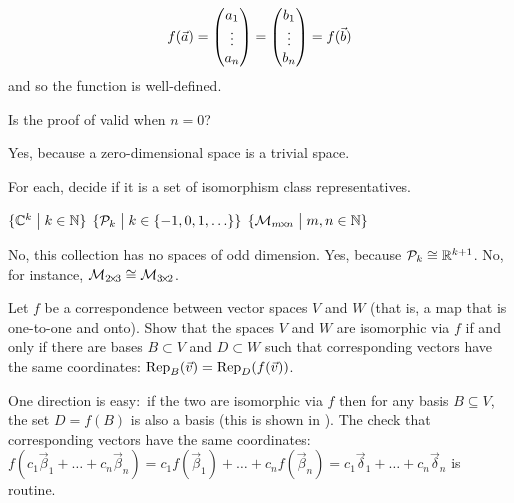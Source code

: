 \begin{exercises}
\begin{answer}
\begin{equation*}
          f(\vec{a})
          =\colvec{a_1 \\ \vdots \\ a_n}=\colvec{b_1 \\ \vdots \\ b_n}
          =f(\vec{b})          
        \end{equation*}
        and so the function is well-defined.
     \end{answer}
  \item 
     Is the proof of  valid when \( n=0 \)?
     \begin{answer}
       Yes, because a zero-dimensional space is a trivial space.
     \end{answer}
  \item 
    For each, decide if it is a set of isomorphism class representatives.
    \begin{exparts*}
      \partsitem \( \set{\C^k \suchthat k\in\N} \)
      \partsitem $\set{\polyspace_k\suchthat k\in \set{-1,0,1,\ldots}}$
      \partsitem \( \set{\matspace_{\nbym{m}{n}}\suchthat 
                   m,n\in\N} \)
    \end{exparts*}
    \begin{answer}
      \begin{exparts}
        \partsitem No, this collection has no spaces of odd dimension.
        \partsitem Yes, because $\polyspace_{k}\isomorphicto\Re^{k+1}$.
        \partsitem No, for instance,
          \( \matspace_{\nbym{2}{3}}\isomorphicto\matspace_{\nbym{3}{2}} \).
      \end{exparts}  
    \end{answer}
  \item
    Let \( f \) be a correspondence between vector spaces \( V \) and \( W \)
    (that is, a map that is one-to-one and onto).
    Show that the spaces \( V \) and \( W \) are isomorphic via \( f \)
    if and only if there are bases \( B\subset V \)
    and \( D\subset W \) such that corresponding vectors have the same
    coordinates:
    \( \rep{\vec{v}}{B}=\rep{f(\vec{v})}{D} \).
    \begin{answer}
       One direction is easy:~if the two are isomorphic via \( f \)
       then for any basis \( B\subseteq V \),
       the set \( D=f(B) \) is also a basis (this is shown in
       ).
       The check that corresponding vectors have the same coordinates:
       \( f(c_1\vec{\beta}_1+\dots+c_n\vec{\beta}_n)
          =c_1f(\vec{\beta}_1)+\dots+c_nf(\vec{\beta}_n)
          =c_1\vec{\delta}_1+\dots+c_n\vec{\delta}_n   \)
       is routine.


\end{answer}
\end{exercises}
